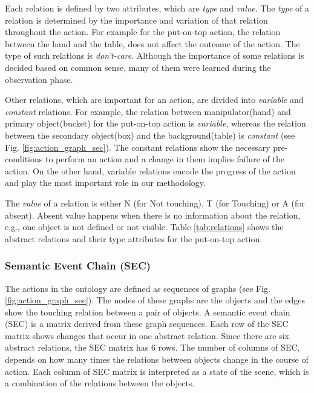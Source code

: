 Each relation is defined by two attributes, which are  \emph{type} and \emph{value}.
The \emph{type} of a relation is determined by the importance and variation of that relation throughout the action.
For example for the put-on-top action, the relation between the hand and the table, does not affect the outcome of the action.
The type of such relations is \emph{don't-care}.
Although the importance of some relations is decided based on common sense, many of them were learned during the observation phase.

Other relations, which are important for an action, are divided into \emph{variable} and \emph{constant} relations.
For example, the relation between manipulator(hand) and primary object(bucket) for the put-on-top action is \emph{variable},
whereas the relation between the secondary object(box) and the background(table) is \emph{constant} (see Fig. \ref{fig:action_graph_sec}).
The constant relations show the necessary pre-conditions to perform an action and a change in them implies failure of the action.
On the other hand, variable relations encode the progress of the action and play the most important role in our methodology.

The \emph{value} of a relation is either N (for Not touching), T (for Touching) or A (for absent).
Absent value happens when there is no information about the relation, e.g., one object is not defined or not visible.
Table \ref{tab:relations} shows the abstract relations and their type attributes for the put-on-top action.



\subsubsection{Semantic Event Chain (SEC)}
\label{sec:SEC}

The actions in the ontology are defined as sequences of graphs (see Fig.\ref{fig:action_graph_sec}).
The nodes of these graphs are the objects and the edges show the touching relation between a pair of objects.
A semantic event chain (SEC) \cite{Aksoy2011} is a matrix derived from these graph sequences.
Each row of the SEC matrix shows changes that occur in one abstract relation.
Since there are six abstract relations, the SEC matrix has 6 rows.
The number of columns of SEC, depends on how many times the relations between objects change in the course of action.
Each column of SEC matrix is interpreted as a state of the scene, which is a combination of the relations between the objects.


